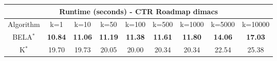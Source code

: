 \begin{tabular}{c|cccccccc}\toprule
\multicolumn{9}{c}{Runtime (seconds) - CTR Roadmap dimacs}\\ \midrule
Algorithm & k=1 & k=10 & k=50 & k=100 & k=500 & k=1000 & k=5000 & k=10000 \\ \midrule
BELA$^*$ & \textbf{10.84} & \textbf{11.06} & \textbf{11.19} & \textbf{11.38} & \textbf{11.61} & \textbf{11.80} & \textbf{14.06} & \textbf{17.03} \\
K$^*$ & 19.70 & 19.73 & 20.05 & 20.00 & 20.34 & 20.34 & 22.54 & 25.38 \\ \bottomrule 
\end{tabular}
